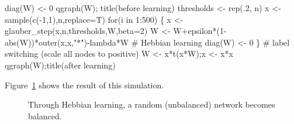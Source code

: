 \documentclass[
  a4paper,
  DIV=11,
  numbers=noendperiod,
  oneside]{scrreprt}
\newenvironment{Shaded}{}{}
\newcommand{\AttributeTok}[1]{\textcolor[rgb]{0.84,0.23,0.29}{#1}}
\newcommand{\CommentTok}[1]{\textcolor[rgb]{0.42,0.45,0.49}{#1}}
\newcommand{\ControlFlowTok}[1]{\textcolor[rgb]{0.84,0.23,0.29}{#1}}
\newcommand{\DecValTok}[1]{\textcolor[rgb]{0.00,0.36,0.77}{#1}}
\newcommand{\FunctionTok}[1]{\textcolor[rgb]{0.44,0.26,0.76}{#1}}
\newcommand{\NormalTok}[1]{\textcolor[rgb]{0.14,0.16,0.18}{#1}}
\newcommand{\OtherTok}[1]{\textcolor[rgb]{0.44,0.26,0.76}{#1}}
\newcommand{\SpecialCharTok}[1]{\textcolor[rgb]{0.00,0.36,0.77}{#1}}
\newcommand{\StringTok}[1]{\textcolor[rgb]{0.01,0.18,0.38}{#1}}
\begin{document}
\begin{Shaded}
\begin{Highlighting}[]
\FunctionTok{diag}\NormalTok{(W) }\OtherTok{\textless{}{-}} \DecValTok{0}
\FunctionTok{qgraph}\NormalTok{(W); }\FunctionTok{title}\NormalTok{(}\StringTok{\textquotesingle{}before learning\textquotesingle{}}\NormalTok{)}
\NormalTok{thresholds }\OtherTok{\textless{}{-}} \FunctionTok{rep}\NormalTok{(.}\DecValTok{2}\NormalTok{, n)}
\NormalTok{x }\OtherTok{\textless{}{-}} \FunctionTok{sample}\NormalTok{(}\FunctionTok{c}\NormalTok{(}\SpecialCharTok{{-}}\DecValTok{1}\NormalTok{,}\DecValTok{1}\NormalTok{),n,}\AttributeTok{replace=}\NormalTok{T)}
\ControlFlowTok{for}\NormalTok{(i }\ControlFlowTok{in} \DecValTok{1}\SpecialCharTok{:}\DecValTok{500}\NormalTok{)}
\NormalTok{\{}
\NormalTok{x }\OtherTok{\textless{}{-}} \FunctionTok{glauber\_step}\NormalTok{(x,n,thresholds,W,}\AttributeTok{beta=}\DecValTok{2}\NormalTok{)}
\NormalTok{W }\OtherTok{\textless{}{-}}\NormalTok{ W}\SpecialCharTok{+}\NormalTok{epsilon}\SpecialCharTok{*}\NormalTok{(}\DecValTok{1}\SpecialCharTok{{-}}\FunctionTok{abs}\NormalTok{(W))}\SpecialCharTok{*}\FunctionTok{outer}\NormalTok{(x,x,}\StringTok{"*"}\NormalTok{)}\SpecialCharTok{{-}}\NormalTok{lambda}\SpecialCharTok{*}\NormalTok{W }\CommentTok{\# Hebbian learning}
\FunctionTok{diag}\NormalTok{(W) }\OtherTok{\textless{}{-}} \DecValTok{0}
\NormalTok{\}}
\CommentTok{\# label switching (scale all nodes to positive)}
\NormalTok{W }\OtherTok{\textless{}{-}}\NormalTok{ x}\SpecialCharTok{*}\FunctionTok{t}\NormalTok{(x}\SpecialCharTok{*}\NormalTok{W);x }\OtherTok{\textless{}{-}}\NormalTok{ x}\SpecialCharTok{*}\NormalTok{x}
\FunctionTok{qgraph}\NormalTok{(W);}\FunctionTok{title}\NormalTok{(}\StringTok{\textquotesingle{}after learning\textquotesingle{}}\NormalTok{)}
\end{Highlighting}
\end{Shaded}

Figure~\ref{fig-ch6-img14-old-83} shows the result of this simulation.

\begin{figure}


\caption{\label{fig-ch6-img14-old-83}Through Hebbian learning, a random
(unbalanced) network becomes balanced.}

\end{figure}%
\end{document}
